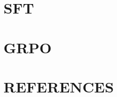 \documentclass[12pt,hyperref,a4paper,UTF8]{ctexart}
\begin{document}
	
	\cover
	
	
	\thispagestyle{empty} %
	
	\newpage
	\tableofcontents
	
	\newpage
	\section{SFT}
	\section{GRPO}
	\newpage
	\appendix
	
	\section{REFERENCES}
	\nocite{*}
	\printbibliography[heading=none]
	
	
\end{document}
